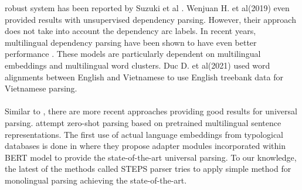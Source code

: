 robust system has been reported by Suzuki et al \cite{semiSupervised2}. Wenjuan
H. et al(2019)\cite{unsupervisedDP} even provided results with unsupervised
dependency parsing. However, their approach does not take into account the
dependency arc labels. In recent years, multilingual dependency parsing have
been shown to have even better performance \cite{malopa,multilingualCaseStudy}.
These models are particularly dependent on multilingual embeddings
\cite{multiEmbedding} and multilingual word clusters. Duc D. et
al(2021)\cite{vietnamese} used word alignments between English and Vietnamese
to use English treebank data for Vietnamese parsing.
\\~\\
Similar to \cite{malopa}, there are more recent approaches providing good
results for universal parsing. \cite{zero-shot} attempt zero-shot parsing based
on pretrained multilingual sentence representations. The first use of actual
language embeddings from typological databases is done in \cite{udapter} where
they propose adapter modules incorporated within BERT model to provide the
state-of-the-art universal parsing. To our knowledge, the latest of the methods
called STEPS parser tries to apply simple method for monolingual parsing
achieving the state-of-the-art.

